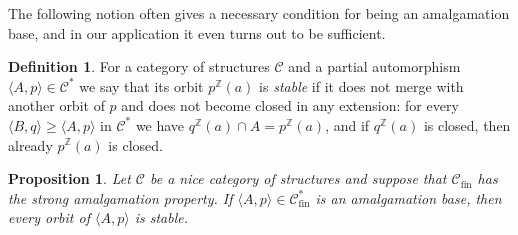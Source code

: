 \documentclass[oneside,notitlepage,12pt]{article}
\newtheorem{prop}[tw]{Proposition}
\theoremstyle{definition}
\newtheorem{df}[tw]{Definition}
\theoremstyle{remark}
\newcommand \seq [1]{\langle #1 \rangle}
\newcommand \Z {\mathbb{Z}}
\newcommand \C {\mathscr{C}}
\newcommand \fin {{\operatorname{fin}}}
\begin{document}
The following notion often gives a necessary condition for being an amalgamation base, and in our application it even turns out to be sufficient.

\begin{df}
For a category of structures $\C$ and a partial automorphism $\seq{A, p} \in \C^*$ we say that its orbit $p^\Z(a)$ is \emph{stable} if it does not merge with another orbit of $p$ and does not become closed in any extension:
for every $\seq{B, q} \geq \seq{A, p}$ in $\C^*$ we have $q^\Z(a) \cap A = p^\Z(a)$, and if $q^\Z(a)$ is closed, then already $p^\Z(a)$ is closed.
\end{df}

\begin{prop} \label{thm:stable_necessary}
    Let $\C$ be a nice category of structures and suppose that $\C_\fin$ has the strong amalgamation property.
    If $\seq{A, p} \in \C^*_\fin$ is an amalgamation base, then every orbit of $\seq{A, p}$ is stable.
\end{prop}
\end{document}
